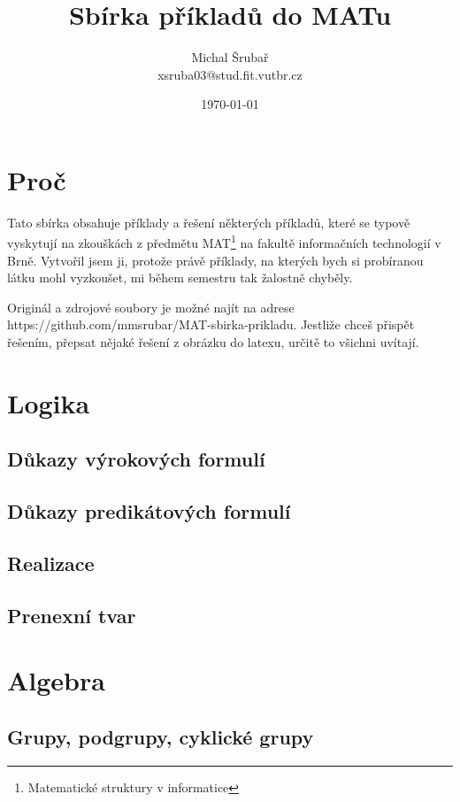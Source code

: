 \documentclass[12pt,a4paper,notitlepage,final]{article}
\author{Michal Šrubař\\xsruba03@stud.fit.vutbr.cz}
\date{\today}
\title{Sbírka příkladů do MATu}
\begin{document}
\maketitle

\section{Proč} \label{proc}
Tato sbírka obsahuje příklady a řešení některých příkladů, které se typově
vyskytují na zkouškách z předmětu MAT\footnote{Matematické struktury v
informatice} na fakultě informačních technologií v Brně. Vytvořil jsem ji,
protože právě příklady, na kterých bych si probíranou látku mohl vyzkoušet, mi
během semestru tak žalostně chyběly. 

Originál a zdrojové soubory je možné najít na adrese
https://github.com/mmsrubar/MAT-sbirka-prikladu. Jestliže chceš přispět řešením,
přepsat nějaké řešení z obrázku do latexu, určitě to všichni uvítají.

\section{Logika} \label{logika}
\subsection{Důkazy výrokových formulí}        
\subsection{Důkazy predikátových formulí}     
\subsection{Realizace}                        
\subsection{Prenexní tvar}                    

\section{Algebra}
\subsection{Grupy, podgrupy, cyklické grupy}  
\end{document}
